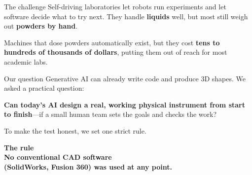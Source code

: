 \documentclass[a0,landscape]{a0poster}
\begin{document}
\noindent
\begin{minipage}[t]{0.275\linewidth}
\Large
\begin{panel}{The challenge}
  Self-driving laboratories let robots run experiments and let software
  decide what to try next. They handle \textbf{liquids} well, but most
  still weigh out \textbf{powders by hand}.

  Machines that dose powders automatically exist, but they cost
  \textbf{tens to hundreds of thousands of dollars}, putting them out of
  reach for most academic labs.
\end{panel}

\vspace{14pt}
\begin{panel}{Our question}
  Generative AI can already write code and produce 3D shapes. We asked a
  practical question:

  \textbf{Can today's AI design a real, working physical instrument from
  start to finish}---if a small human team sets the goals and checks the
  work?

  To make the test honest, we set one strict rule.
\end{panel}

\vspace{14pt}
\begin{tcolorbox}[enhanced, colback=ember, colframe=ember, arc=6pt,
  left=18pt,right=18pt,top=14pt,bottom=14pt, boxrule=0pt]
  \color{white}\centering
  {\Large\bfseries The rule}\\[8pt]
  {\huge\bfseries No conventional CAD software\\(SolidWorks, Fusion 360)
  was used at any point.}
\end{tcolorbox}
\end{minipage}
\hfill
\end{document}
